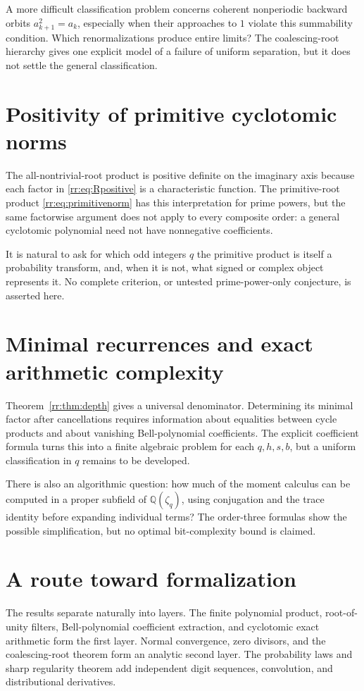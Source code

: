 \documentclass[11pt,a4paper,oneside,openany]{book}
\numberwithin{equation}{chapter}
\theoremstyle{definition}
\theoremstyle{remark}
\newcommand{\Q}{\mathbb Q}
\begin{document}
A more difficult classification problem concerns coherent nonperiodic backward orbits \(a_{k+1}^2=a_k\), especially when their approaches to \(1\) violate this summability condition. Which renormalizations produce entire limits? The coalescing-root hierarchy gives one explicit model of a failure of uniform separation, but it does not settle the general classification.

\section{Positivity of primitive cyclotomic norms}
The all-nontrivial-root product is positive definite on the imaginary axis because each factor in \eqref{rr:eq:Rpositive} is a characteristic function. The primitive-root product \eqref{rr:eq:primitivenorm} has this interpretation for prime powers, but the same factorwise argument does not apply to every composite order: a general cyclotomic polynomial need not have nonnegative coefficients.

It is natural to ask for which odd integers \(q\) the primitive product is itself a probability transform, and, when it is not, what signed or complex object represents it. No complete criterion, or untested prime-power-only conjecture, is asserted here.

\section{Minimal recurrences and exact arithmetic complexity}
Theorem~\ref{rr:thm:depth} gives a universal denominator. Determining its minimal factor after cancellations requires information about equalities between cycle products and about vanishing Bell-polynomial coefficients. The explicit coefficient formula turns this into a finite algebraic problem for each \(q,h,s,b\), but a uniform classification in \(q\) remains to be developed.

There is also an algorithmic question: how much of the moment calculus can be computed in a proper subfield of \(\Q(\zeta_q)\), using conjugation and the trace identity before expanding individual terms? The order-three formulas show the possible simplification, but no optimal bit-complexity bound is claimed.

\section{A route toward formalization}
The results separate naturally into layers. The finite polynomial product, root-of-unity filters, Bell-polynomial coefficient extraction, and cyclotomic exact arithmetic form the first layer. Normal convergence, zero divisors, and the coalescing-root theorem form an analytic second layer. The probability laws and sharp regularity theorem add independent digit sequences, convolution, and distributional derivatives.
\end{document}

